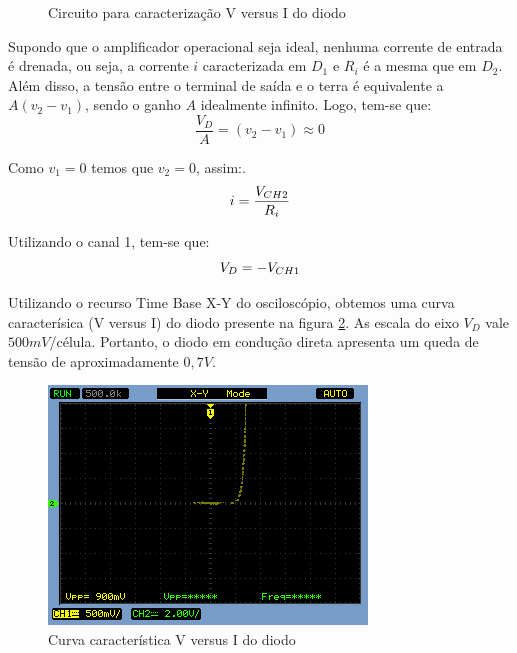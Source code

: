 \documentclass[a4paper]{article} %
\begin{document}
\vspace{3mm}
\begin{figure}[h]
\centerline{}
\caption{Circuito para caracterização V versus I do diodo \label{circ:1}}
\end{figure}

Supondo que o amplificador operacional seja ideal, nenhuma corrente de entrada é drenada, ou seja, a corrente $i$ caracterizada em $D_1$ e $R_i$ é a mesma que em $D_2$. Além disso, a tensão entre o terminal de saída e o terra é equivalente a $A(v_2-v_1)$, sendo o ganho $A$ idealmente infinito. Logo, tem-se que:
\begin{equation}
\frac{V_D}{A}=(v_2-v_1)\approx0
\end{equation}

Como $v_1=0$ temos que $v_2=0$, assim:.
\begin{equation}
i=\frac{V_{CH2}}{R_{i}}\\
\end{equation}

Utilizando o canal 1, tem-se que:  
\begin{equation}
V_D=-V_{CH1}\\
\end{equation}

\newpage
Utilizando o recurso Time Base X-Y do osciloscópio, obtemos uma curva caracterísica (V versus I) do diodo presente na figura \ref{fig:q1-curva2}. As escala do eixo $V_D$ vale $500mV$/célula. Portanto, o diodo em condução direta apresenta um queda de tensão de aproximadamente $0,7V$.    
\begin{figure}[h]
\begin{centering}
\includegraphics[scale=0.7]{Imagens/3.1/NewFile0} \caption{Curva característica V versus I do diodo  \label{fig:q1-curva2}}
\par\end{centering}
\end{figure}
\end{document}
